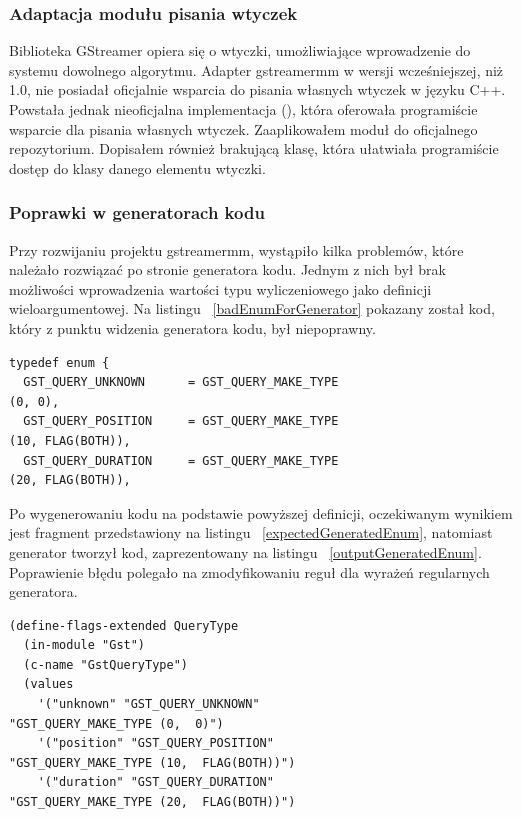 \documentclass[12pt]{article}
\begin{document}
\subsubsection{Adaptacja modułu pisania wtyczek}
Biblioteka GStreamer opiera się o wtyczki, umożliwiające wprowadzenie do systemu dowolnego algorytmu. Adapter gstreamermm w wersji wcześniejszej, niż 1.0, nie posiadał oficjalnie wsparcia do pisania własnych wtyczek w języku C++. Powstała jednak nieoficjalna implementacja (\cite{pepergithub}), która oferowała programiście wsparcie dla pisania własnych wtyczek. Zaaplikowałem moduł do oficjalnego repozytorium. Dopisałem również brakującą klasę, która ułatwiała programiście dostęp do klasy danego elementu wtyczki.
\subsubsection{Poprawki w generatorach kodu}
Przy rozwijaniu projektu gstreamermm, wystąpiło kilka problemów, które należało rozwiązać po stronie generatora kodu. Jednym z nich był brak możliwości wprowadzenia wartości typu wyliczeniowego jako definicji wieloargumentowej. Na listingu ~\ref{badEnumForGenerator} pokazany został kod, który z punktu widzenia generatora kodu, był niepoprawny.
    \begin{lstlisting}[caption=Przykładowy fragment niepoprawnego z punktu widzenia generatora kodu źródłowego, label=badEnumForGenerator]
typedef enum {
  GST_QUERY_UNKNOWN      = GST_QUERY_MAKE_TYPE
(0, 0),
  GST_QUERY_POSITION     = GST_QUERY_MAKE_TYPE 
(10, FLAG(BOTH)),
  GST_QUERY_DURATION     = GST_QUERY_MAKE_TYPE 
(20, FLAG(BOTH)),
    \end{lstlisting}

Po wygenerowaniu kodu na podstawie powyższej definicji, oczekiwanym wynikiem jest fragment przedstawiony na listingu ~\ref{expectedGeneratedEnum}, natomiast generator tworzył kod, zaprezentowany na listingu ~\ref{outputGeneratedEnum}. Poprawienie błędu polegało na zmodyfikowaniu reguł dla wyrażeń regularnych generatora.

    \begin{lstlisting}[caption=Oczekiwany wynik działania generatora kodu, label=badEnumForGenerator]
(define-flags-extended QueryType
  (in-module "Gst")
  (c-name "GstQueryType")
  (values
    '("unknown" "GST_QUERY_UNKNOWN" 
"GST_QUERY_MAKE_TYPE (0,  0)")
    '("position" "GST_QUERY_POSITION" 
"GST_QUERY_MAKE_TYPE (10,  FLAG(BOTH))")
    '("duration" "GST_QUERY_DURATION" 
"GST_QUERY_MAKE_TYPE (20,  FLAG(BOTH))")
    \end{lstlisting}
\end{document}
